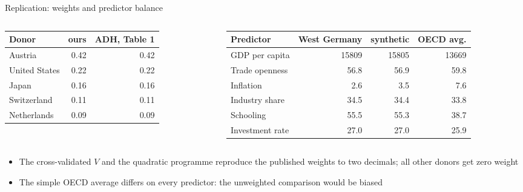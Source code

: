 \begin{frame}{Replication: weights and predictor balance}
\itemsize{\small}
\begin{columns}[T]
\begin{column}{0.38\textwidth}
\begin{center}
\footnotesize
\begin{tabular}{lrr}
\toprule
\textbf{Donor} & \textbf{ours} & \textbf{ADH, Table 1} \\
\midrule
Austria & 0.42 & 0.42 \\
United States & 0.22 & 0.22 \\
Japan & 0.16 & 0.16 \\
Switzerland & 0.11 & 0.11 \\
Netherlands & 0.09 & 0.09 \\
\bottomrule
\end{tabular}
\end{center}

\end{column}
\begin{column}{0.6\textwidth}
\begin{center}
\footnotesize
\begin{tabular}{lrrr}
\toprule
\textbf{Predictor} & \textbf{West Germany} & \textbf{synthetic} & \textbf{OECD avg.} \\
\midrule
GDP per capita & 15809 & 15805 & 13669 \\
Trade openness & 56.8 & 56.9 & 59.8 \\
Inflation & 2.6 & 3.5 & 7.6 \\
Industry share & 34.5 & 34.4 & 33.8 \\
Schooling & 55.5 & 55.3 & 38.7 \\
Investment rate & 27.0 & 27.0 & 25.9 \\
\bottomrule
\end{tabular}
\end{center}

\end{column}
\end{columns}\begin{itemize}
    \item The cross-validated $V$ and the quadratic programme reproduce the published weights to two decimals; all other donors get zero weight
    \item The simple OECD average differs on every predictor: the unweighted comparison would be biased
\end{itemize}
\end{frame}

